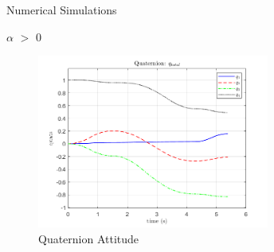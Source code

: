 \documentclass{beamer}
\begin{document}
\begin{frame}{Numerical Simulations}
	\begin{block}{$\alpha$ $>$ 0}
		
		\begin{figure}[H]
			\label{fig:quats_phi_total}
			\begin{center}
				\includegraphics[width=3in]{figures/alphaNot0/quats_phi_total.png}
			\end{center}
			\caption{Quaternion Attitude}
		\end{figure}
		
		
	\end{block}
\end{frame}
\end{document}
